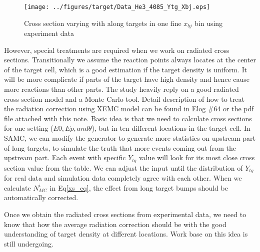 \documentclass[a4paper,18.pt]{article}
\begin{document}
\begin{figure}[!ht]
 \begin{center}
  \texttt{[image: ../figures/target/Data\_He3\_4085\_Ytg\_Xbj.eps]}
  \caption[Cross section varying with along targets in data]{Cross section varying with along targets in one fine $x_{bj}$ bin using experiment data}
  \label{xs_bump_data}
 \end{center}
\end{figure}

However, special treatments are required when we work on radiated cross sections. Transitionally we assume the reaction points always locates at the center of the target cell, which is a good estimation if the target density is uniform. It will be more complicate if parts of the target have high density and hence cause more reactions than other parts. The study heavily reply on a good radiated cross section model and a Monte Carlo tool. Detail description of how to treat the radiation correction using XEMC model can be found in Elog \#64 or the pdf file attached with this note. Basic idea is that we need to calculate cross sections for one setting ($E0, Ep, and \theta$), but in ten different locations in the target cell. In SAMC, we can modify the generator to generate more statistics on upstream part of long targets, to simulate the truth that more events coming out from the upstream part. Each event with specific $Y_{tg}$ value will look for its most close cross section value from the table. We can adjust the input until the distribution of $Y_{tg}$ for real data and simulation data completely agree with each other. When we calculate $N_{MC}^{i}$ in Eq\eqref{xs_eq}, the effect from long target bumps should be automatically corrected. 

Once we obtain the radiated cross sections from experimental data, we need to know that how the average radiation correction should be with the good understanding of target density at different locations. Work base on this idea is still undergoing.
\end{document}
